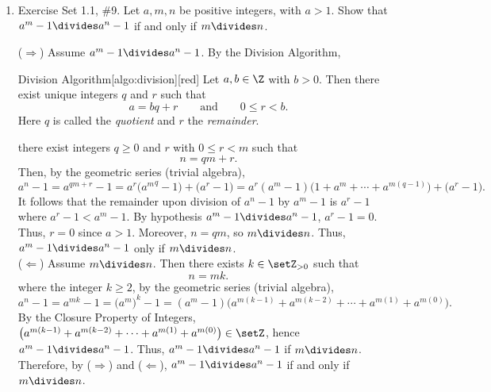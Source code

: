 \begin{enumerate}
  \item Exercise Set 1.1, \#9. Let $a, m, n$ be positive integers, with $a > 1$. Show that $a^{m}-1 \divides a^{n}-1$ if and only if $m\divides n$.
  \begin{subprove}
    ($\Rightarrow$) Assume $a^{m}-1\divides a^{n}-1$. By the Division Algorithm,
    \begin{define}{Division Algorithm}[algo:division][red]
    Let $a,b\in\Z$ with $b>0$. Then there exist unique integers $q$ and $r$ such that
    \[
    a = b q + r \qquad\text{and}\qquad 0\le r < b.
    \]
    Here $q$ is called the \emph{quotient} and $r$ the \emph{remainder}.
    \end{define}
    there exist integers $q\ge 0$ and $r$ with $0\le r<m$ such that
    \[
      n = qm + r.
    \]
    Then, by the geometric series (trivial algebra),
    \[
      a^{n}-1 = a^{qm+r}-1 = a^{r}\bigl({a^{m}}^{q}-1\bigr) + \bigl(a^{r}-1\bigr)= a^{r}(a^{m}-1)\bigl(1+a^{m}+\cdots+a^{m(q-1)}\bigr) + \bigl(a^{r}-1\bigr).
    \]
    It follows that the remainder upon division of $a^{n}-1$ by $a^{m}-1$ is $a^{r}-1$ where $a^{r}-1 < a^{m}-1$. 
    By hypothesis 
    $a^{m}-1\divides a^{n}-1$, $a^{r}-1=0$. 
    Thus, $r=0$ since $a>1$. Moreover, $n=qm$, so $m\divides n$.
    Thus, $a^{m}-1 \divides a^{n}-1$ only if $m\divides n$.\vspace*{10px}\\
    ($\Leftarrow$) Assume $m\divides n$. Then there exists $k\in\setZ_{>0}$ such that
    \[
      n = m k.
    \]
    where the integer $k\ge 2$, by the geometric series (trivial algebra),
    \[
      a^{n}-1 = a^{mk}-1 = \bigl(a^{m}\bigr)^{k}-1
        = (a^{m}-1)\bigl(a^{m(k-1)}+a^{m(k-2)}+\cdots + a^{m(1)}+a^{m(0)}\bigr).
    \]
    By the Closure Property of Integers, $\bigl(a^{m(k-1)}+a^{m(k-2)}+\cdots + a^{m(1)}+a^{m(0)}\bigr)\in\setZ$, 
    hence $a^{m}-1\divides a^{n}-1$. 
    Thus, $a^{m}-1 \divides a^{n}-1$ if $m\divides n$.\vspace*{10px}\\
    Therefore, by ($\Rightarrow$) and ($\Leftarrow$), $a^{m}-1 \divides a^{n}-1$ if and only if $m\divides n$.
  \end{subprove}


  \newpage


\end{enumerate}
